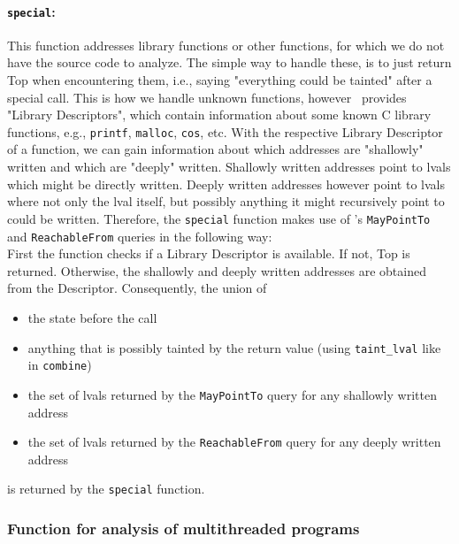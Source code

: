         \paragraph{\texttt{special}:} This function addresses library functions or other functions, for which we do not have the source code to analyze. The simple way to handle these, is to just return Top when encountering them, i.e., saying "everything could be tainted" after a special call. This is how we handle unknown functions, however \gob\ provides "Library Descriptors", which contain information about some known C library functions, e.g., \texttt{printf}, \texttt{malloc}, \texttt{cos}, etc. With the respective Library Descriptor of a function, we can gain information about which addresses are "shallowly" written and which are "deeply" written. Shallowly written addresses point to \ac{lval}s which might be directly written. Deeply written addresses however point to \ac{lval}s where not only the \ac{lval} itself, but possibly anything it might recursively point to could be written. Therefore, the \texttt{special} function makes use of \gob's \texttt{MayPointTo} and \texttt{ReachableFrom} queries in the following way:\\
        First the function checks if a Library Descriptor is available. If not, Top is returned. Otherwise, the shallowly and deeply written addresses are obtained from the Descriptor. Consequently, the union of 
        \begin{itemize}
          \item the state before the call
          \item anything that is possibly tainted by the return value (using \texttt{taint\_lval} like in \texttt{combine}) 
          \item the set of \ac{lval}s returned by the \texttt{MayPointTo} query for any shallowly written address
          \item the set of \ac{lval}s returned by the \texttt{ReachableFrom} query for any deeply written address
        \end{itemize}
        is returned by the \texttt{special} function.

    \subsubsection{Function for analysis of multithreaded programs}

